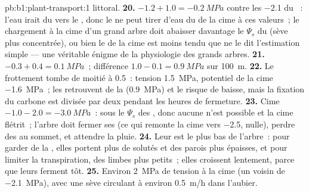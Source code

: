 \begin{solution}{pb:b1:plant-transport:1}
littoral.
\textbf{20.} $-1.2 + 1.0 = \qty{-0.2}{MPa}$ contre les \qty{-2.1}{} du
~: l'eau irait du  vers le , donc le  ne peut
tirer d'eau du  de la cime à ces valeurs~; le chargement à la
cime d'un grand arbre doit abaisser davantage le $\Psi_s$ du 
(sève plus concentrée), ou bien le  de la cime est moins tendu
que ne le dit l'estimation simple --- une véritable énigme de la
physiologie des grands arbres.
\textbf{21.} $-0.3 + 0.4 = \qty{0.1}{MPa}$~; différence $1.0 - 0.1 =
\qty{0.9}{MPa}$ sur \qty{100}{m}.
\textbf{22.} Le frottement tombe de moitié à \qty{0.5}{}~: tension
\qty{1.5}{MPa}, potentiel de la cime \qty{-1.6}{MPa}~; les 
retrouvent de la  (\qty{0.9}{MPa}) et le risque de
 baisse, mais la fixation du carbone est divisée par deux
pendant les heures de fermeture.
\textbf{23.} Cime $-1.0 - 2.0 = \qty{-3.0}{MPa}$~: sous le $\Psi_s$ des
, donc aucune  n'est possible et la cime flétrit~;
l'arbre doit fermer ses  (ce qui remonte la cime vers
\qty{-2.5}{},  nulle), perdre des  au sommet, et
attendre la pluie.
\textbf{24.} Leur  est le plus bas de l'arbre~: pour
garder de la , elles portent plus de solutés et des parois
plus épaisses, et pour limiter la transpiration, des limbes plus
petits~; elles croissent lentement, parce que leurs  ferment
tôt.
\textbf{25.} Environ \qty{2}{MPa} de tension à la cime (un  voisin de \qty{-2.1}{MPa}), avec une sève circulant à environ
\qty{0.5}{m/h} dans l'aubier.
\end{solution}
